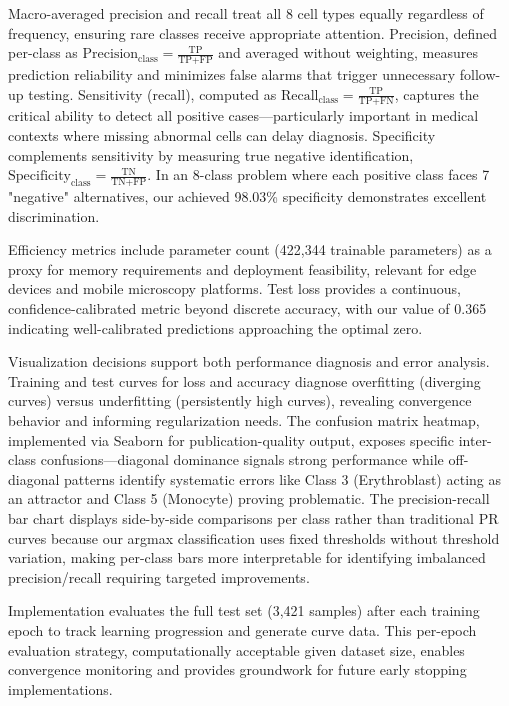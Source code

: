 \documentclass[runningheads]{llncs}
\begin{document}
Macro-averaged precision and recall treat all 8 cell types equally regardless of frequency, ensuring rare classes receive appropriate attention. Precision, defined per-class as $\text{Precision}_{\text{class}} = \frac{\text{TP}}{\text{TP} + \text{FP}}$ and averaged without weighting, measures prediction reliability and minimizes false alarms that trigger unnecessary follow-up testing. Sensitivity (recall), computed as $\text{Recall}_{\text{class}} = \frac{\text{TP}}{\text{TP} + \text{FN}}$, captures the critical ability to detect all positive cases—particularly important in medical contexts where missing abnormal cells can delay diagnosis. Specificity complements sensitivity by measuring true negative identification, $\text{Specificity}_{\text{class}} = \frac{\text{TN}}{\text{TN} + \text{FP}}$. In an 8-class problem where each positive class faces 7 "negative" alternatives, our achieved 98.03\% specificity demonstrates excellent discrimination.

Efficiency metrics include parameter count (422,344 trainable parameters) as a proxy for memory requirements and deployment feasibility, relevant for edge devices and mobile microscopy platforms. Test loss provides a continuous, confidence-calibrated metric beyond discrete accuracy, with our value of 0.365 indicating well-calibrated predictions approaching the optimal zero.

Visualization decisions support both performance diagnosis and error analysis. Training and test curves for loss and accuracy diagnose overfitting (diverging curves) versus underfitting (persistently high curves), revealing convergence behavior and informing regularization needs. The confusion matrix heatmap, implemented via Seaborn for publication-quality output, exposes specific inter-class confusions—diagonal dominance signals strong performance while off-diagonal patterns identify systematic errors like Class 3 (Erythroblast) acting as an attractor and Class 5 (Monocyte) proving problematic. The precision-recall bar chart displays side-by-side comparisons per class rather than traditional PR curves because our argmax classification uses fixed thresholds without threshold variation, making per-class bars more interpretable for identifying imbalanced precision/recall requiring targeted improvements.

Implementation evaluates the full test set (3,421 samples) after each training epoch to track learning progression and generate curve data. This per-epoch evaluation strategy, computationally acceptable given dataset size, enables convergence monitoring and provides groundwork for future early stopping implementations.
\end{document}
